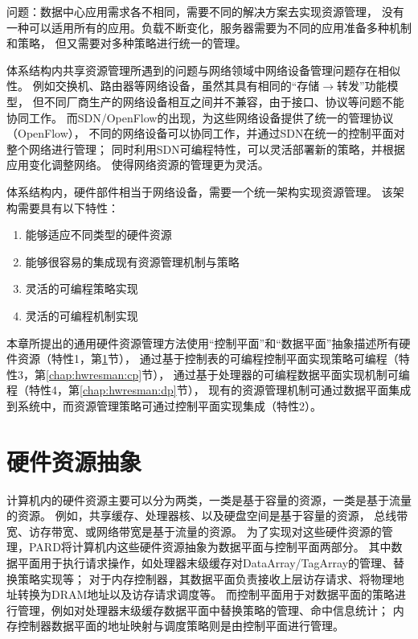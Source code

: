 问题：数据中心应用需求各不相同，需要不同的解决方案去实现资源管理，
没有一种可以适用所有的应用。负载不断变化，服务器需要为不同的应用准备多种机制和策略，
但又需要对多种策略进行统一的管理。

体系结构内共享资源管理所遇到的问题与网络领域中网络设备管理问题存在相似性。
例如交换机、路由器等网络设备，虽然其具有相同的``存储$\rightarrow$转发''功能模型，
但不同厂商生产的网络设备相互之间并不兼容，由于接口、协议等问题不能协同工作。
而SDN/OpenFlow的出现，为这些网络设备提供了统一的管理协议（OpenFlow），
不同的网络设备可以协同工作，并通过SDN在统一的控制平面对整个网络进行管理；
同时利用SDN可编程特性，可以灵活部署新的策略，并根据应用变化调整网络。
使得网络资源的管理更为灵活。


体系结构内，硬件部件相当于网络设备，需要一个统一架构实现资源管理。
该架构需要具有以下特性：

\begin{enumerate}[leftmargin=2\parindent, nolistsep, label=\arabic*）]
  \item 能够适应不同类型的硬件资源
  \item 能够很容易的集成现有资源管理机制与策略
  \item 灵活的可编程策略实现
  \item 灵活的可编程机制实现
\end{enumerate}

本章所提出的通用硬件资源管理方法使用``控制平面''和``数据平面''抽象描述所有硬件资源（特性1，第\ref{chap:hwresman:res}节），
通过基于控制表的可编程控制平面实现策略可编程（特性3，第\ref{chap:hwresman:cp}节），
通过基于处理器的可编程数据平面实现机制可编程（特性4，第\ref{chap:hwresman:dp}节），
现有的资源管理机制可通过数据平面集成到系统中，而资源管理策略可通过控制平面实现集成（特性2）。



\section{硬件资源抽象}
\label{chap:hwresman:res}

计算机内的硬件资源主要可以分为两类，一类是基于容量的资源，一类是基于流量的资源。
例如，共享缓存、处理器核、以及硬盘空间是基于容量的资源，
总线带宽、访存带宽、或网络带宽是基于流量的资源。
为了实现对这些硬件资源的管理，PARD将计算机内这些硬件资源抽象为数据平面与控制平面两部分。
其中数据平面用于执行请求操作，如处理器末级缓存对DataArray/TagArray的管理、替换策略实现等；
对于内存控制器，其数据平面负责接收上层访存请求、将物理地址转换为DRAM地址以及访存请求调度等。
而控制平面用于对数据平面的策略进行管理，例如对处理器末级缓存数据平面中替换策略的管理、命中信息统计；
内存控制器数据平面的地址映射与调度策略则是由控制平面进行管理。

